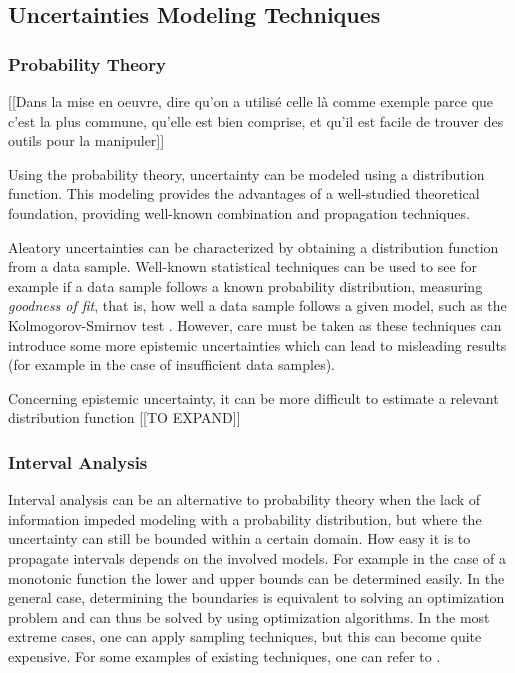 \subsection{Uncertainties Modeling Techniques}

\subsubsection{Probability Theory}

[[Dans la mise en oeuvre, dire qu'on a utilisé celle là comme exemple parce que c'est la plus commune, qu'elle est bien comprise, et qu'il est facile de trouver des outils pour la manipuler]]

Using the probability theory, uncertainty can be modeled using a distribution function. This modeling provides the advantages of a well-studied theoretical foundation, providing well-known combination and propagation techniques.

Aleatory uncertainties can be characterized by obtaining a distribution function from a data sample.
Well-known statistical techniques can be used to see for example if a data sample follows a known probability distribution, measuring \emph{goodness of fit}, that is, how well a data sample follows a given model, such as the Kolmogorov-Smirnov test \cite{Massey_1951}. 
However, care must be taken as these techniques can introduce some more epistemic uncertainties which can lead to misleading results (for example in the case of insufficient data samples).

Concerning epistemic uncertainty, it can be more difficult to estimate a relevant distribution function  [[TO EXPAND]]

\subsubsection{Interval Analysis}

Interval analysis can be an alternative to probability theory when the lack of information impeded modeling with a probability distribution, but where the uncertainty can still be bounded within a certain domain.
How easy it is to propagate intervals depends on the involved models. For example in the case of a monotonic function the lower and upper bounds can be determined easily. In the general case, determining the boundaries is equivalent to solving an optimization problem and can thus be solved by using optimization algorithms. In the most extreme cases, one can apply sampling techniques, but this can become quite expensive.
For some examples of existing techniques, one can refer to \cite{Kreinovich_2008}.

